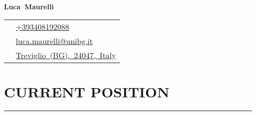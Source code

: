 \documentclass[10pt]{article}
\newcommand{\cvsection}[1]{\section*{\centering\normalsize\uppercase{#1}}\vspace{-16pt}\rule{\linewidth}{0.2pt}}
\begin{document}
\pagestyle{empty}


\centering
{\huge\textbf{Luca~Maurelli}}




\begin{table}[h]
	\centering
	\begin{tabular}{@{}ll@{}}
		 \faPhone & \href{tel:+393408192088}{+393408192088} \\
		 \faAt & \href{mailto:luca.maurelli@unibg.it}{luca.maurelli@unibg.it} \\
		 \faHome & \href{https://goo.gl/maps/qSb6hkSyAdgnEt5w7}{Treviglio~(BG),~24047,~Italy}
	\end{tabular}
\end{table}




\flushleft


\cvsection{current position}
\end{document}
